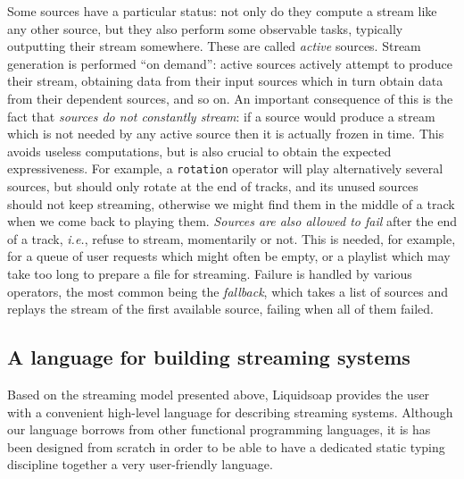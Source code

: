 \documentclass{llncs}
\newcommand{\liquidsoap}{Liquidsoap}
\newcommand{\ie}{\emph{i.e.},}
\begin{document}
Some sources have a particular status: not only do they compute a stream like any
other source, but they also perform some observable tasks, typically outputting
their stream somewhere. These are called \emph{active} sources. Stream
generation is performed ``on demand'': active sources actively attempt to
produce their stream, obtaining data from their input sources which in turn
obtain data from their dependent sources, and so on. An important consequence of
this is the fact that \emph{sources do not constantly stream}: if a source would
produce a stream which is not needed by any active source then it is actually
frozen in time.
This avoids useless computations, but is also crucial to obtain
the expected expressiveness. For example, a \texttt{rotation} operator will play
alternatively several sources, but should only rotate at the end of tracks, and
its unused sources should not keep streaming, otherwise we might find them in
the middle of a track when we come back to playing them.
\emph{Sources are also allowed to fail} after the
end of a track,
\ie{} refuse to stream, momentarily or not.
This is needed, for example,
for a queue of user requests which might often be empty,
or a playlist which may take too long to prepare a file for streaming.
Failure is handled by various operators, the most common being
the \emph{fallback}, which takes a list of sources and replays the
stream of the first available source, failing when all of them failed.

\subsection{A language for building streaming systems}

Based on the streaming model presented above, \liquidsoap{} provides the user
with a convenient high-level language for describing streaming systems.
Although our language borrows from other functional programming languages, it is
has been designed from scratch in order to be able to have a dedicated static
typing discipline together a very user-friendly language. 
\end{document}
